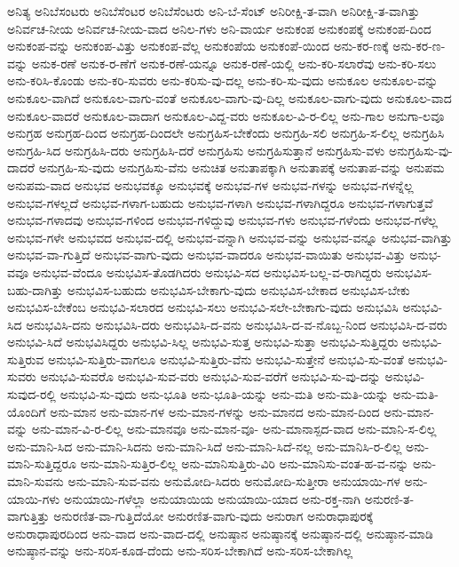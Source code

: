 {ಅನಿತ್ಯ
ಅನಿಬೆಸಂಟರು
ಅನಿಬೆಸೆಂಟರ
ಅನಿಬೆಸೆಂಟರು
ಅನಿ-ಬೆ-ಸೆಂಟ್
ಅನಿರೀಕ್ಷಿ-ತ-ವಾಗಿ
ಅನಿರೀಕ್ಷಿ-ತ-ವಾಗಿತ್ತು
ಅನಿರ್ವಚ-ನೀಯ
ಅನಿರ್ವಚ-ನೀಯ-ವಾದ
ಅನಿಲ-ಗಳು
ಅನಿ-ವಾರ್ಯ
ಅನುಕಂಪ
ಅನುಕಂಪಕ್ಕೆ
ಅನುಕಂಪ-ದಿಂದ
ಅನುಕಂಪ-ವನ್ನು
ಅನುಕಂಪ-ವಿತ್ತು
ಅನುಕಂಪ-ವೆಲ್ಲ
ಅನುಕಂಪೆಯ
ಅನುಕಂಪೆ-ಯಿಂದ
ಅನು-ಕರ-ಣಕ್ಕೆ
ಅನು-ಕರ-ಣ-ವನ್ನು
ಅನುಕ-ರಣೆ
ಅನುಕ-ರ-ಣೆಗೆ
ಅನುಕ-ರಣೆ-ಯನ್ನೂ
ಅನುಕ-ರಣೆ-ಯಲ್ಲಿ
ಅನು-ಕರಿ-ಸಲಾರೆವು
ಅನು-ಕರಿ-ಸಲು
ಅನು-ಕರಿಸಿ-ಕೊಂಡು
ಅನು-ಕರಿ-ಸುವರು
ಅನು-ಕರಿಸು-ವು-ದಲ್ಲ
ಅನು-ಕರಿ-ಸು-ವುದು
ಅನುಕೂಲ
ಅನುಕೂಲ-ವನ್ನು
ಅನುಕೂಲ-ವಾಗಿದೆ
ಅನುಕೂಲ-ವಾಗು-ವಂತೆ
ಅನುಕೂಲ-ವಾಗು-ವು-ದಿಲ್ಲ
ಅನುಕೂಲ-ವಾಗು-ವುದು
ಅನುಕೂಲ-ವಾದ
ಅನುಕೂಲ-ವಾದರೆ
ಅನುಕೂಲ-ವಾದಾಗ
ಅನುಕೂಲ-ವಿದ್ದ-ವರು
ಅನುಕೂಲ-ವಿ-ರ-ಲಿಲ್ಲ
ಅನು-ಗಾಲ
ಅನುಗಾ-ಲವೂ
ಅನುಗ್ರಹ
ಅನುಗ್ರಹ-ದಿಂದ
ಅನುಗ್ರಹ-ದಿಂದಲೇ
ಅನುಗ್ರಹಿಸ-ಬೇಕೆಂದು
ಅನುಗ್ರಹಿ-ಸಲಿ
ಅನುಗ್ರಹಿ-ಸ-ಲಿಲ್ಲ
ಅನುಗ್ರಹಿಸಿ
ಅನುಗ್ರಹಿ-ಸಿದ
ಅನುಗ್ರಹಿಸಿ-ದರು
ಅನುಗ್ರಹಿಸಿ-ದರೆ
ಅನುಗ್ರಹಿಸು
ಅನುಗ್ರಹಿಸುತ್ತಾನೆ
ಅನುಗ್ರಹಿಸು-ವಳು
ಅನುಗ್ರಹಿಸು-ವು-ದಾದರೆ
ಅನುಗ್ರಹಿ-ಸು-ವುದು
ಅನುಗ್ರಹಿಸು-ವೆನು
ಅನುಚಿತ
ಅನುತಾಪಕ್ಕಾಗಿ
ಅನುತಾಪಕ್ಕೆ
ಅನುತಾಪ-ವನ್ನು
ಅನುಪಮ
ಅನುಪಮ-ವಾದ
ಅನುಭವ
ಅನುಭವಕ್ಕೂ
ಅನುಭವಕ್ಕೆ
ಅನುಭವ-ಗಳ
ಅನುಭವ-ಗಳನ್ನು
ಅನುಭವ-ಗಳನ್ನೆಲ್ಲ
ಅನುಭವ-ಗಳಲ್ಲದೆ
ಅನುಭವ-ಗಳಾಗ-ಬಹುದು
ಅನುಭವ-ಗಳಾಗಿ
ಅನುಭವ-ಗಳಾಗಿದ್ದರೂ
ಅನುಭವ-ಗಳಾಗುತ್ತವೆ
ಅನುಭವ-ಗಳಾದವು
ಅನುಭವ-ಗಳಿಂದ
ಅನುಭವ-ಗಳಿದ್ದುವು
ಅನುಭವ-ಗಳು
ಅನುಭವ-ಗಳೆಂದು
ಅನುಭವ-ಗಳೆಲ್ಲ
ಅನುಭವ-ಗಳೇ
ಅನುಭವದ
ಅನುಭವ-ದಲ್ಲಿ
ಅನುಭವ-ವನ್ನಾಗಿ
ಅನುಭವ-ವನ್ನು
ಅನುಭವ-ವನ್ನೂ
ಅನುಭವ-ವಾಗಿತ್ತು
ಅನುಭವ-ವಾ-ಗುತ್ತಿದೆ
ಅನುಭವ-ವಾಗು-ವುದು
ಅನುಭವ-ವಾದರೂ
ಅನುಭವ-ವಾಯಿತು
ಅನುಭವ-ವಿತ್ತು
ಅನುಭ-ವವೂ
ಅನುಭವ-ವೆಂದೂ
ಅನುಭವಿಸ-ತೊಡಗಿದರು
ಅನುಭವಿ-ಸದ
ಅನುಭವಿಸ-ಬಲ್ಲ-ವ-ರಾಗಿದ್ದರು
ಅನುಭವಿಸ-ಬಹು-ದಾಗಿತ್ತು
ಅನುಭವಿಸ-ಬಹುದು
ಅನುಭವಿಸ-ಬೇಕಾಗು-ವುದು
ಅನುಭವಿಸ-ಬೇಕಾದ
ಅನುಭವಿಸ-ಬೇಕು
ಅನುಭವಿಸ-ಬೇಕೆಂಬ
ಅನುಭವಿ-ಸಲಾರದ
ಅನುಭವಿ-ಸಲು
ಅನುಭವಿ-ಸಲೇ-ಬೇಕಾಗು-ವುದು
ಅನುಭವಿಸಿ
ಅನುಭವಿ-ಸಿದ
ಅನುಭವಿಸಿ-ದನು
ಅನುಭವಿಸಿ-ದರು
ಅನುಭವಿಸಿ-ದ-ವನು
ಅನುಭವಿಸಿ-ದ-ವ-ನೊಬ್ಬ-ನಿಂದ
ಅನುಭವಿಸಿ-ದ-ವರು
ಅನುಭವಿ-ಸಿದೆ
ಅನುಭವಿಸಿದ್ದರು
ಅನುಭವಿ-ಸಿಲ್ಲ
ಅನುಭವಿ-ಸುತ್ತ
ಅನುಭವಿ-ಸುತ್ತಾ
ಅನುಭವಿ-ಸುತ್ತಿದ್ದರು
ಅನುಭವಿ-ಸುತ್ತಿರುವ
ಅನುಭವಿ-ಸುತ್ತಿರು-ವಾಗಲೂ
ಅನುಭವಿ-ಸುತ್ತಿರು-ವೆನು
ಅನುಭವಿ-ಸುತ್ತೇನೆ
ಅನುಭವಿ-ಸು-ವಂತೆ
ಅನುಭವಿ-ಸುವರು
ಅನುಭವಿ-ಸುವರೊ
ಅನುಭವಿ-ಸುವ-ವರು
ಅನುಭವಿ-ಸುವ-ವರೆಗೆ
ಅನುಭವಿ-ಸು-ವು-ದನ್ನು
ಅನುಭವಿ-ಸುವುದ-ರಲ್ಲಿ
ಅನುಭವಿ-ಸು-ವುದು
ಅನು-ಭೂತಿ
ಅನು-ಭೂತಿ-ಯನ್ನು
ಅನು-ಮತಿ
ಅನು-ಮತಿ-ಯನ್ನು
ಅನು-ಮತಿ-ಯೊಂದಿಗೆ
ಅನು-ಮಾನ
ಅನು-ಮಾನ-ಗಳ
ಅನು-ಮಾನ-ಗಳನ್ನು
ಅನು-ಮಾನದ
ಅನು-ಮಾನ-ದಿಂದ
ಅನು-ಮಾನ-ವನ್ನು
ಅನು-ಮಾನ-ವಿ-ರ-ಲಿಲ್ಲ
ಅನು-ಮಾನವೂ
ಅನು-ಮಾನ-ವೂ-
ಅನು-ಮಾನಾಸ್ಪದ-ವಾದ
ಅನು-ಮಾನಿ-ಸ-ಲಿಲ್ಲ
ಅನು-ಮಾನಿ-ಸಿದ
ಅನು-ಮಾನಿ-ಸಿದನು
ಅನು-ಮಾನಿ-ಸಿದೆ
ಅನು-ಮಾನಿ-ಸಿದೆ-ನಲ್ಲ
ಅನು-ಮಾನಿಸಿ-ರ-ಲಿಲ್ಲ
ಅನು-ಮಾನಿ-ಸುತ್ತಿದ್ದರೂ
ಅನು-ಮಾನಿ-ಸುತ್ತಿರ-ಲಿಲ್ಲ
ಅನು-ಮಾನಿಸುತ್ತಿರು-ವಿರಿ
ಅನು-ಮಾನಿಸು-ವಂತ-ಹ-ವ-ನನ್ನು
ಅನು-ಮಾನಿ-ಸುವನು
ಅನು-ಮಾನಿ-ಸುವ-ವನು
ಅನುಮೋದಿ-ಸಿದರು
ಅನುಮೋದಿ-ಸುತ್ತೀರಾ
ಅನುಯಾಯಿ-ಗಳ
ಅನು-ಯಾಯಿ-ಗಳು
ಅನುಯಾಯಿ-ಗಳೆಲ್ಲಾ
ಅನುಯಾಯಿಯ
ಅನುಯಾಯಿ-ಯಾದ
ಅನು-ರಕ್ತ-ನಾಗಿ
ಅನುರಣಿ-ತ-ವಾಗುತ್ತಿತ್ತು
ಅನುರಣಿತ-ವಾ-ಗುತ್ತಿದೆಯೋ
ಅನುರಣಿತ-ವಾಗು-ವುದು
ಅನುರಾಗ
ಅನುರಾಧಾಪುರಕ್ಕೆ
ಅನುರಾಧಾಪುರದಿಂದ
ಅನು-ವಾದ
ಅನು-ವಾದ-ದಲ್ಲಿ
ಅನುಷ್ಠಾನ
ಅನುಷ್ಠಾನಕ್ಕೆ
ಅನುಷ್ಠಾನ-ದಲ್ಲಿ
ಅನುಷ್ಠಾನ-ಮಾಡಿ
ಅನುಷ್ಠಾನ-ವನ್ನು
ಅನು-ಸರಿಸ-ಕೂಡ-ದೆಂದು
ಅನು-ಸರಿಸ-ಬೇಕಾಗಿದೆ
ಅನು-ಸರಿಸ-ಬೇಕಾಗಿಲ್ಲ
}
